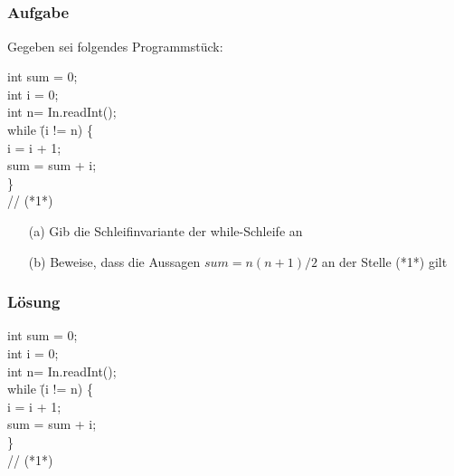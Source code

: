 \subsection*{}
\begin{frame}
	\frametitle{Aufgabe}
	Gegeben sei folgendes Programmstück:
	\begin{tabbing}
	 int sum = 0; \\
   int i = 0; \\
   int n= In.readInt(); \\
   while \= (i != n) \{ \\
   \> i = i + 1; \\
   \> sum = sum + i; \\
   \} \\
   // (*1*)
   \end{tabbing}
   \begin{enumerate}
   	\item[(a)] Gib die Schleifinvariante der while-Schleife an
   	\pause
   	\item[(b)] Beweise, dass die Aussagen $sum = n(n+1)/2$ an der Stelle (*1*) gilt
   \end{enumerate}
\end{frame}

\begin{frame}
	\frametitle{Lösung}
		\begin{tabbing}
	 int sum = 0; \\
   int i = 0; \\
   int n= In.readInt(); \\
   while \= (i != n) \{ \\
   \> i = i + 1; \\
   \> sum = sum + i; \\
   \} \\
   // (*1*) \\
   \end{tabbing}
\end{frame}

